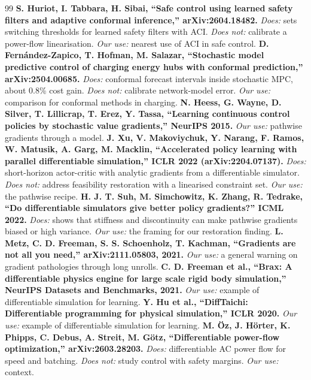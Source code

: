 \documentclass[11pt]{article}
\begin{document}
\begin{thebibliography}{99}
\textbf{S. Huriot, I. Tabbara, H. Sibai, ``Safe control using learned safety filters and adaptive conformal inference,'' arXiv:2604.18482.} \emph{Does:} sets switching thresholds for learned safety filters with ACI. \emph{Does not:} calibrate a power-flow linearisation. \emph{Our use:} nearest use of ACI in safe control.
\textbf{D. Fern\'andez-Zapico, T. Hofman, M. Salazar, ``Stochastic model predictive control of charging energy hubs with conformal prediction,'' arXiv:2504.00685.} \emph{Does:} conformal forecast intervals inside stochastic MPC, about 0.8\% cost gain. \emph{Does not:} calibrate network-model error. \emph{Our use:} comparison for conformal methods in charging.
\textbf{N. Heess, G. Wayne, D. Silver, T. Lillicrap, T. Erez, Y. Tassa, ``Learning continuous control policies by stochastic value gradients,'' NeurIPS 2015.} \emph{Our use:} pathwise gradients through a model.
\textbf{J. Xu, V. Makoviychuk, Y. Narang, F. Ramos, W. Matusik, A. Garg, M. Macklin, ``Accelerated policy learning with parallel differentiable simulation,'' ICLR 2022 (arXiv:2204.07137).} \emph{Does:} short-horizon actor-critic with analytic gradients from a differentiable simulator. \emph{Does not:} address feasibility restoration with a linearised constraint set. \emph{Our use:} the pathwise recipe.
\textbf{H. J. T. Suh, M. Simchowitz, K. Zhang, R. Tedrake, ``Do differentiable simulators give better policy gradients?'' ICML 2022.} \emph{Does:} shows that stiffness and discontinuity can make pathwise gradients biased or high variance. \emph{Our use:} the framing for our restoration finding.
\textbf{L. Metz, C. D. Freeman, S. S. Schoenholz, T. Kachman, ``Gradients are not all you need,'' arXiv:2111.05803, 2021.} \emph{Our use:} a general warning on gradient pathologies through long unrolls.
\textbf{C. D. Freeman et al., ``Brax: A differentiable physics engine for large scale rigid body simulation,'' NeurIPS Datasets and Benchmarks, 2021.} \emph{Our use:} example of differentiable simulation for learning.
\textbf{Y. Hu et al., ``DiffTaichi: Differentiable programming for physical simulation,'' ICLR 2020.} \emph{Our use:} example of differentiable simulation for learning.
\textbf{M. \"Oz, J. H\"orter, K. Phipps, C. Debus, A. Streit, M. G\"otz, ``Differentiable power-flow optimization,'' arXiv:2603.28203.} \emph{Does:} differentiable AC power flow for speed and batching. \emph{Does not:} study control with safety margins. \emph{Our use:} context.

\end{thebibliography}
\end{document}
